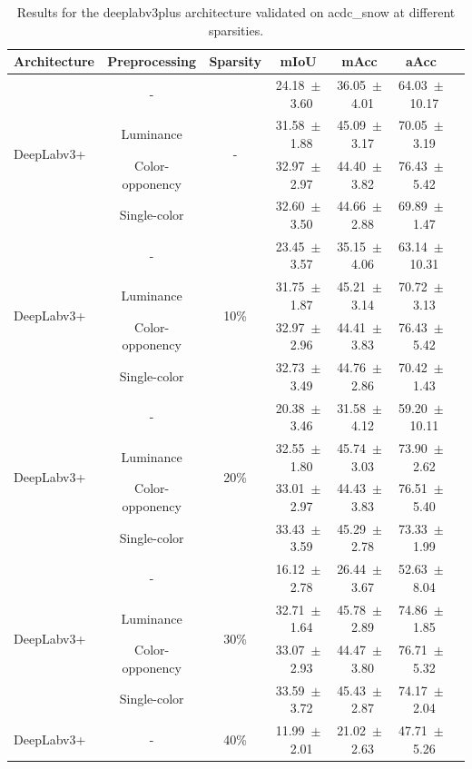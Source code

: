 \begin{table}[h]
\centering
\caption{Results for the deeplabv3plus architecture validated on acdc_snow at different sparsities.}
\begin{tabular}{@{}lccc ccc@{}}
\toprule
Architecture & Preprocessing & Sparsity & mIoU & mAcc & aAcc \\
\midrule

\multirow{4}{*}{DeepLabv3+} & - & \multirow{4}{*}{-} & 24.18~$\pm$~3.60 & 36.05~$\pm$~4.01 & 64.03~$\pm$~10.17 \\
& Luminance & & 31.58~$\pm$~1.88 & 45.09~$\pm$~3.17 & 70.05~$\pm$~3.19 \\
& Color-opponency & & 32.97~$\pm$~2.97 & 44.40~$\pm$~3.82 & 76.43~$\pm$~5.42 \\
& Single-color & & 32.60~$\pm$~3.50 & 44.66~$\pm$~2.88 & 69.89~$\pm$~1.47 \\
\midrule
\multirow{4}{*}{DeepLabv3+} & - & \multirow{4}{*}{10\%} & 23.45~$\pm$~3.57 & 35.15~$\pm$~4.06 & 63.14~$\pm$~10.31 \\
& Luminance & & 31.75~$\pm$~1.87 & 45.21~$\pm$~3.14 & 70.72~$\pm$~3.13 \\
& Color-opponency & & 32.97~$\pm$~2.96 & 44.41~$\pm$~3.83 & 76.43~$\pm$~5.42 \\
& Single-color & & 32.73~$\pm$~3.49 & 44.76~$\pm$~2.86 & 70.42~$\pm$~1.43 \\
\midrule
\multirow{4}{*}{DeepLabv3+} & - & \multirow{4}{*}{20\%} & 20.38~$\pm$~3.46 & 31.58~$\pm$~4.12 & 59.20~$\pm$~10.11 \\
& Luminance & & 32.55~$\pm$~1.80 & 45.74~$\pm$~3.03 & 73.90~$\pm$~2.62 \\
& Color-opponency & & 33.01~$\pm$~2.97 & 44.43~$\pm$~3.83 & 76.51~$\pm$~5.40 \\
& Single-color & & 33.43~$\pm$~3.59 & 45.29~$\pm$~2.78 & 73.33~$\pm$~1.99 \\
\midrule
\multirow{4}{*}{DeepLabv3+} & - & \multirow{4}{*}{30\%} & 16.12~$\pm$~2.78 & 26.44~$\pm$~3.67 & 52.63~$\pm$~8.04 \\
& Luminance & & 32.71~$\pm$~1.64 & 45.78~$\pm$~2.89 & 74.86~$\pm$~1.85 \\
& Color-opponency & & 33.07~$\pm$~2.93 & 44.47~$\pm$~3.80 & 76.71~$\pm$~5.32 \\
& Single-color & & 33.59~$\pm$~3.72 & 45.43~$\pm$~2.87 & 74.17~$\pm$~2.04 \\
\midrule
\multirow{4}{*}{DeepLabv3+} & - & \multirow{4}{*}{40\%} & 11.99~$\pm$~2.01 & 21.02~$\pm$~2.63 & 47.71~$\pm$~5.26 \\

\end{tabular}
\end{table}
